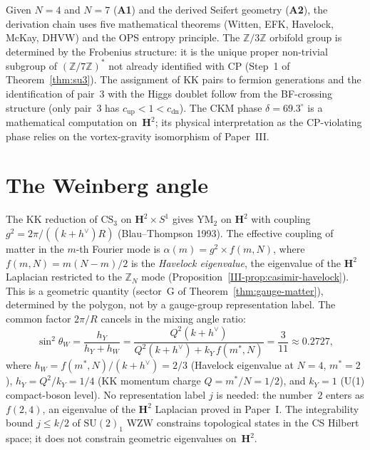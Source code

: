 \begin{remark}
\label{rmk:honest-inputs}
Given $N = 4$ and $N = 7$ (\textbf{A1}) and the derived Seifert geometry
(\textbf{A2}), the derivation chain uses five mathematical
theorems (Witten, EFK, Havelock, McKay, DHVW) and the
OPS entropy principle.
The $\mathbb{Z}/3\mathbb{Z}$ orbifold group is determined by the Frobenius structure:
it is the unique proper non-trivial subgroup of
$(\mathbb{Z}/7\mathbb{Z})^*$ not already identified with CP
(Step~1 of Theorem~\ref{thm:su3}).
The assignment of KK pairs to fermion generations and
the identification of pair~$3$ with the Higgs doublet
follow from the BF-crossing structure
(only pair~$3$ has $c_{\mathrm{up}} < 1 < c_{\mathrm{dn}}$).
The CKM phase $\delta = 69.3^\circ$ is a mathematical
computation on~$\mathbf{H}^2$; its physical interpretation
as the CP-violating phase relies on the vortex-gravity
isomorphism of Paper~III.
\end{remark}

\section{The Weinberg angle}
\label{sec:weinberg}

\begin{derivation}
\label{thm:weinberg}
The KK reduction of $\mathrm{CS}_3$ on $\mathbf{H}^2 \times S^1$
gives $\mathrm{YM}_2$ on $\mathbf{H}^2$ with coupling
$g^2 = 2\pi/((k{+}h^\vee)R)$ (Blau--Thompson 1993).
The effective coupling of matter in the $m$-th Fourier mode is
$\alpha(m) = g^2 \times f(m,N)$,
where $f(m,N) = m(N{-}m)/2$ is the \emph{Havelock eigenvalue}, the eigenvalue of the $\mathbf{H}^2$ Laplacian restricted
to the $\mathbb{Z}_N$ mode
(Proposition~\ref{III-prop:casimir-havelock}).
This is a geometric quantity (sector~G of
Theorem~\ref{thm:gauge-matter}), determined by the
polygon, not by a gauge-group representation label.
The common factor $2\pi/R$ cancels in the mixing angle ratio:
\begin{equation}\label{eq:weinberg}
  \sin^2\theta_W
  = \frac{h_Y}{h_Y + h_W}
  = \frac{Q^2(k{+}h^\vee)}{Q^2(k{+}h^\vee) + k_Y\,f(m^*,N)}
  = \frac{3}{11} \approx 0.2727,
\end{equation}
where $h_W = f(m^*,N)/(k{+}h^\vee) = 2/3$
(Havelock eigenvalue at $N = 4$, $m^* = 2$),
$h_Y = Q^2/k_Y = 1/4$ (KK momentum charge $Q = m^*/N = 1/2$),
and $k_Y = 1$ (U(1) compact-boson level).
No representation label $j$ is needed:
the number~$2$ enters as $f(2,4)$, an eigenvalue of the
$\mathbf{H}^2$ Laplacian proved in Paper~I.
The integrability bound $j \le k/2$ of $\mathrm{SU}(2)_1$
WZW constrains topological states in the CS Hilbert space;
it does not constrain geometric eigenvalues on~$\mathbf{H}^2$.
\end{derivation}

